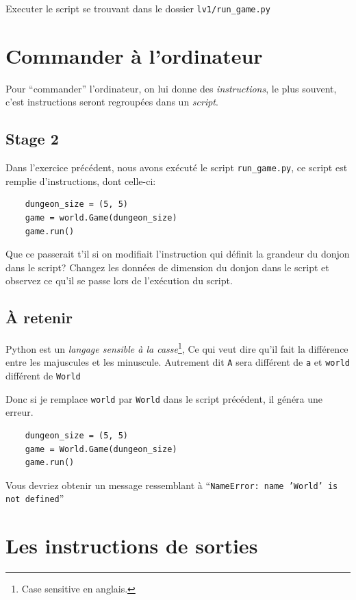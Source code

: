 \documentclass[12pt,a4paper]{book}
\newcommand{\path}[1]{\texttt{#1}}
\newcommand{\codeintext}[1]{\texttt{#1}}
\begin{document}
Executer le script se trouvant dans le dossier \path{lv1/run\_game.py}

\section{Commander à l'ordinateur}

Pour ``commander'' l’ordinateur, on lui donne des \emph{instructions}, le plus souvent, c’est instructions seront regroupées dans un \emph{script}.

\subsection{Stage 2}

Dans l’exercice précédent, nous avons exécuté le script \path{run\_game.py}, ce script est remplie d’instructions, dont celle-ci:

\begin{lstlisting}
    dungeon_size = (5, 5)
    game = world.Game(dungeon_size)
    game.run()
\end{lstlisting}

Que ce passerait t’il si on modifiait l’instruction qui définit la grandeur du donjon dans le script?
Changez les données de dimension du donjon dans le script et observez ce qu'il se passe lors de l'exécution du script.

\subsection{\`{A} retenir}

Python est un \emph{langage sensible à la casse}\footnote{Case sensitive en anglais.}, Ce qui veut dire qu'il fait la différence entre les majuscules et les minuscule. Autrement dit \codeintext{A} sera différent de \codeintext{a} et \codeintext{world} différent de \codeintext{World}

Donc si je remplace \codeintext{world} par \codeintext{World} dans le script précédent, il généra une erreur.

\begin{lstlisting}
    dungeon_size = (5, 5)
    game = World.Game(dungeon_size)
    game.run()
\end{lstlisting}

Vous devriez obtenir un message ressemblant à ``\codeintext{NameError: name 'World' is not defined}''


\section{Les instructions de sorties}
\end{document}

